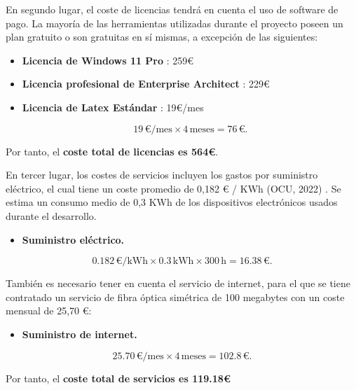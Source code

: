 En segundo lugar, el coste de licencias tendrá en cuenta el uso de software de pago. La mayoría de las herramientas utilizadas durante el proyecto poseen un plan gratuito o son gratuitas en sí mismas, a excepción de las siguientes:

\begin{itemize}
    \item \textbf{Licencia de Windows 11 Pro} \cite{licenciaWindows}: 259€
    \item \textbf{Licencia profesional de Enterprise Architect} \cite{licenciaEA}: 229€
    \item \textbf{Licencia de Latex Estándar} \cite{licenciaOffice}: 19€/mes

\begin{equation}
    19 \, \text{€/mes} \times 4 \, \text{meses} = 76 \, \text{€}.
\end{equation}
    
\end{itemize}

Por tanto, el \textbf{coste total de licencias es 564€}.

En tercer lugar, los costes de servicios incluyen los gastos por suministro eléctrico, el cual tiene un coste promedio de 0,182 € / KWh (OCU, 2022) . Se estima un consumo medio de 0,3 KWh de los dispositivos electrónicos usados durante el desarrollo.

\begin{itemize}
    \item \textbf{Suministro eléctrico.}
\end{itemize}

\begin{equation}
0.182 \, \text{€/kWh} \times 0.3 \, \text{kWh} \times 300 \, \text{h} = 16.38 \, \text{€}.
\end{equation}

También es necesario tener en cuenta el servicio de internet, para el que se tiene contratado un servicio de fibra óptica simétrica de 100 megabytes con un coste mensual de 25,70 €:

\begin{itemize}
    \item \textbf{Suministro de internet.}
\end{itemize}

\begin{equation}
25.70 \, \text{€/mes} \times 4 \, \text{meses} = 102.8 \, \text{€}.
\end{equation}

Por tanto, el \textbf{coste total de servicios es 119.18€}

